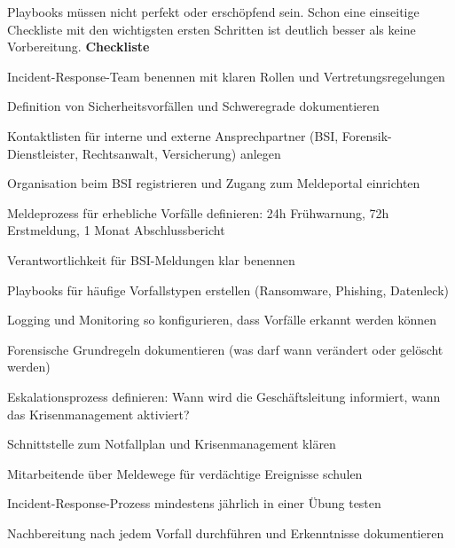 Playbooks müssen nicht perfekt oder erschöpfend sein. Schon eine einseitige Checkliste mit den wichtigsten ersten Schritten ist deutlich besser als keine Vorbereitung.
\newpage
\textbf{Checkliste}
\begin{checklist}
\item Incident-Response-Team benennen mit klaren Rollen und Vertretungsregelungen
\item Definition von Sicherheitsvorfällen und Schweregrade dokumentieren
\item Kontaktlisten für interne und externe Ansprechpartner (BSI, Forensik-Dienstleister, Rechtsanwalt, Versicherung) anlegen
\item Organisation beim BSI registrieren und Zugang zum Meldeportal einrichten
\item Meldeprozess für erhebliche Vorfälle definieren: 24h Frühwarnung, 72h Erstmeldung, 1 Monat Abschlussbericht
\item Verantwortlichkeit für BSI-Meldungen klar benennen
\item Playbooks für häufige Vorfallstypen erstellen (Ransomware, Phishing, Datenleck)
\item Logging und Monitoring so konfigurieren, dass Vorfälle erkannt werden können
\item Forensische Grundregeln dokumentieren (was darf wann verändert oder gelöscht werden)
\item Eskalationsprozess definieren: Wann wird die Geschäftsleitung informiert, wann das Krisenmanagement aktiviert?
\item Schnittstelle zum Notfallplan und Krisenmanagement klären
\item Mitarbeitende über Meldewege für verdächtige Ereignisse schulen
\item Incident-Response-Prozess mindestens jährlich in einer Übung testen
\item Nachbereitung nach jedem Vorfall durchführen und Erkenntnisse dokumentieren
\end{checklist}
